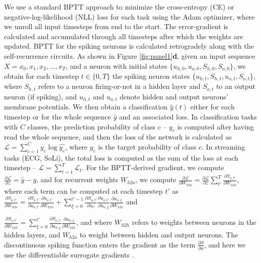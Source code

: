 \documentclass[fleqn,10pt]{wlscirep}
\begin{document}
We use a standard BPTT approach \cite{bellec2020solution} to minimize the cross-entropy (CE) or negative-log-likelihood (NLL) loss for each task using the Adam\cite{kingma2014adam} optimizer, where we unroll all input timesteps from end to the start. The error-gradient is calculated and accumulated through all timesteps after which the weights are updated. BPTT for the spiking neurons is calculated retrogradely along with the self-recurrence circuits. As shown in Figure \ref{fig:panel1}\textbf{d}, given an input sequence $X = {x_0,x_1,x_2, \dots,x_T}$, and a neuron with initial states $\{u_{h,0},u_{o,0},S_{h,0},S_{o,0}\}$, we obtain for each timestep $t\in\{0,T\}$ the spiking neuron states $\{u_{h,t}, S_{h,t}, u_{o,t}, S_{o,t} $\}, where $S_{h,t}$ refers to a neuron firing-or-not in a hidden layer and $S_{o,t}$ to an output neuron (if spiking), and $u_{h,t}$ and $u_{o,t}$ denote hidden and output neurons' membrane potentials. We then obtain a classification $\hat{y}(t)$ either for each timestep or for the whole sequence $\hat{y}$ and an associated loss. In classification tasks with $C$ classes, the prediction probability of class $c$ --  $\hat{y_c}$ is computed after having read the whole sequence, and  then the loss of the network is calculated as $\mathcal{L} = \sum_{c=1}^C y_c \log \hat{y_c}$, where $y_c$ is the target probability of class $c$. In streaming tasks (ECG, SoLi), the total loss is computed as the sum of the loss at each timestep -- $\mathcal{L} = \sum_{t=1}^T \mathcal{L}_t$. For the BPTT-derived gradient, we compute
$\frac{\partial \mathcal{L}}{\partial z} = \hat{y} - y$,
and for recurrent weights $W_{h2o}$, we compute $\frac{\partial \mathcal{L}}{\partial W_{h2o}} = \frac{\partial \mathcal{L}}{\partial z} \sum_{t'}^T \frac{\partial S_{o,t'}}{\partial W_{h2o}}$, where each term can be computed at each timestep $t'$ as $\frac{\partial S_{o,{t'}}}{\partial W_{h2o}} = \frac{\partial S_{o,{t'}}}{\partial u_{o,t'}} \frac{\partial u_{o,t'}}{\partial W_{h2o}}+\sum_{\xi=0}^{{t'}-1} \frac{\partial S_{o,{t'}}}{\partial u_{t'}} \frac{\partial u_{o,t'}}{\partial u_{o,\xi}} \frac{\partial u_{o,\xi}}{\partial W_{h2o}}$ and 


  $ \frac{\partial S_{o,{t'}}}{\partial W_{h2h}}= \sum_{\xi=0}^{{t'}} \frac{\partial S_{o,{t'}}}{\partial u_{h,\xi}}\frac{\partial u_{h,\xi}}{\partial W_{h2h}}$, and where $W_{h2h}$ refers to weights between neurons in the hidden layers, and $W_{h2o}$ to weight between hidden and output neurons.
The discontinuous spiking function enters the gradient as the term $\frac{\partial S}{\partial u}$, and here we use the differentiable surrogate gradients \cite{neftci2019surrogate}.  
\end{document}
